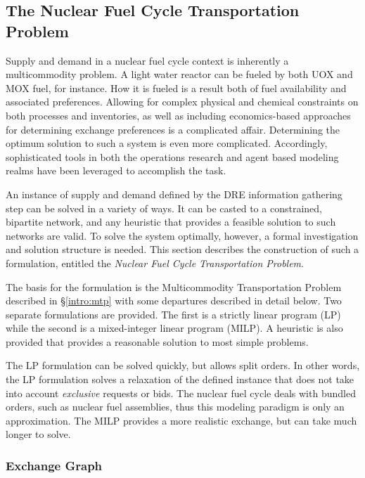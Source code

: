 \subsection{The Nuclear Fuel Cycle Transportation Problem}\label{abm:dre:fctp}

Supply and demand in a nuclear fuel cycle context is inherently a multicommodity
problem. A light water reactor can be fueled by both UOX and MOX fuel, for
instance. How it is fueled is a result both of fuel availability and associated
preferences. Allowing for complex physical and chemical constraints on both
processes and inventories, as well as including economics-based approaches for
determining exchange preferences is a complicated affair. Determining the
optimum solution to such a system is even more complicated. Accordingly,
sophisticated tools in both the operations research and agent based modeling
realms have been leveraged to accomplish the task.

An instance of supply and demand defined by the DRE information gathering step
can be solved in a variety of ways. It can be casted to a constrained, bipartite
network, and any heuristic that provides a feasible solution to such networks
are valid. To solve the system optimally, however, a formal investigation and
solution structure is needed. This section describes the construction of such a
formulation, entitled the \textit{Nuclear Fuel Cycle Transportation Problem}.

The basis for the formulation is the Multicommodity Transportation Problem
described in \S\ref{intro:mtp} with some departures described in detail
below. Two separate formulations are provided. The first is a strictly linear
program (LP) while the second is a mixed-integer linear program (MILP). A
heuristic is also provided that provides a reasonable solution to most simple
problems.

The LP formulation can be solved quickly, but allows split orders. In other
words, the LP formulation solves a relaxation of the defined instance that does
not take into account \textit{exclusive} requests or bids. The nuclear fuel
cycle deals with bundled orders, such as nuclear fuel assemblies, thus this
modeling paradigm is only an approximation. The MILP provides a more realistic
exchange, but can take much longer to solve. 

\subsubsection{Exchange Graph}

